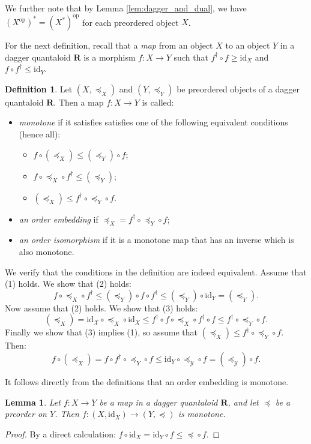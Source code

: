 \documentclass[12pt]{tac}
\newtheorem{lemma}[theorem]{Lemma}
\theoremstyle{definition}
\newtheorem{definition}[theorem]{Definition}
\theoremstyle{remark}
\newcommand{\X}{\mathcal X}
\newcommand{\Y}{\mathcal Y}
\newcommand{\qo}{{\boldsymbol{\preccurlyeq}}}
\newcommand{\<}{\langle}
\renewcommand{\>}{\rangle}
\renewcommand{\:}{\colon}
\newcommand{\op}{\mathrm{op}}
\newcommand{\id}{\mathrm{id}}
\begin{document}
We further note that by Lemma \ref{lem:dagger_and_dual}, we have $(X^\op)^*=(X^*)^\op$ for each preordered object $X$.


For the next definition, recall that a \emph{map} from an object $X$ to an object $Y$ in a dagger quantaloid $\mathbf R$ is a morphism $f:X\to Y$ such that $f^\dag\circ f\geq\id_X$ and $f\circ f^\dag\leq \id_Y$.
\begin{definition}
    Let $(X,\qo_X)$ and $(Y,\qo_Y)$ be preordered objects of a dagger quantaloid $\mathbf R$. Then a map $f:X\to Y$ is called:
    \begin{itemize}
        \item \emph{monotone} if it satisfies satisfies one of the following equivalent conditions (hence all):
  \begin{itemize}
    \item[(1)] $f\circ (\qo_X)\leq (\qo_Y)\circ f$;
    \item[(2)] $f\circ \qo_X\circ f^\dag\leq (\qo_Y)$;
    \item[(3)] $(\qo_X)\leq f^\dag\circ \qo_Y\circ f$.
\end{itemize}
\item \emph{an order embedding} if $\qo_X=f^\dag\circ\qo_Y\circ f$;
\item \emph{an order isomorphism} if it is a monotone map that has an inverse which is also monotone.
    \end{itemize}
    \end{definition}
We verify that the conditions in the definition are indeed equivalent. Assume that (1) holds. We show that (2) holds: 
\[ f\circ \qo_X\circ f^\dag\leq (\qo_Y)\circ f\circ f^\dag\leq (\qo_Y)\circ \id_Y=(\qo_Y).\]
Now assume that (2) holds. We show that (3) holds:
\[ (\qo_X)= \id_\X\circ \qo_X\circ \id_X\leq f^\dag\circ f\circ \qo_X\circ f^\dag\circ f\leq f^\dag\circ \qo_Y\circ f.\]
Finally we show that (3) implies (1), so assume that $(\qo_X)\leq f^\dag\circ\qo_Y\circ f$. Then:
\[f\circ (\qo_X)=f\circ f^\dag\circ\qo_Y\circ f\leq\id_Y\circ \qo_\Y\circ f=(\qo_\Y)\circ f.\]

It follows directly from the definitions that an order embedding is monotone. 

\begin{lemma}\label{lem:functions with trivially ordered domain are monotone}
    Let $f:X\to Y$ be a map in a dagger quantaloid $\mathbf R$, and let $\qo$ be a preorder on $Y$. Then $f:(X,\id_X)\to(Y,\qo)$ is monotone.
\end{lemma}
\begin{proof}
    By a direct calculation: $f\circ\id_X=\id_Y\circ f\leq\qo\circ f$.
\end{proof}
\end{document}
